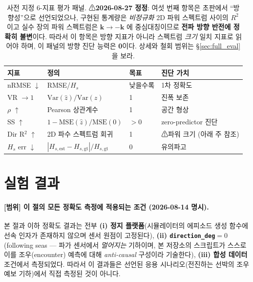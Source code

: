 \documentclass[11pt]{report}
\numberwithin{equation}{chapter}
\numberwithin{figure}{chapter}
\numberwithin{table}{chapter}
\begin{document}
\begin{table}[htbp]
\centering
\caption{사전 지정 6-지표 평가 패널.
⚠\textbf{2026-08-27 정정}: 여섯 번째 항목은 초판에서 ``방향성''으로 선언되었으나,
구현된 통계량은 \emph{비정규화} 2D 파워 스펙트럼 사이의 $R^2$ 이고
실수 장의 파워 스펙트럼은 $\mathbf{k}\to-\mathbf{k}$ 에 중심대칭이므로
\textbf{전파 방향 반전에 정확히 불변}이다. 따라서 이 항목은 방향 지표가 아니라
스펙트럼 \emph{크기} 일치 지표로 읽어야 하며, 이 패널의 방향 진단 능력은
\textbf{0}이다. 상세와 철회 범위는 \S\ref{sec:full_eval} 을 보라.}
\label{tab:metrics}
\begin{tabular}{llll}
\toprule
지표 & 정의 & 목표 & 진단 가치 \\
\midrule
nRMSE $\downarrow$ & RMSE/$H_s$ & 낮을수록 & 1차 정확도 \\
VR $\to 1$ & $\mathrm{Var}(\hat{z})/\mathrm{Var}(z)$ & 1 & 진폭 보존 \\
$\rho$ $\uparrow$ & Pearson 상관계수 & 1 & 공간 형상 \\
SS $\uparrow$ & $1 - \mathrm{MSE}(\hat{z})/\mathrm{MSE}(0)$ & $> 0$ & zero-predictor 진단 \\
Dir R$^2$ $\uparrow$ & 2D 파수 스펙트럼 회귀 & 1 & ⚠파워 크기 (아래 주 참조) \\
$H_s$ err $\downarrow$ & $|H_{s,\text{est}} - H_{s,\text{gt}}|/H_{s,\text{gt}}$ & 0 & 유의파고 \\
\bottomrule
\end{tabular}
\end{table}

\section{실험 결과}
\label{sec:results}

\paragraph{[범위] 이 절의 모든 정확도 측정에 적용되는 조건 (2026-08-14 명시).}
본 절과 이하 정확도 결과는 전부 \textbf{(i) 정지 플랫폼}(시뮬레이터의 에피소드 생성 함수에
선속 인자가 존재하지 않으며 센서 원점이 고정된다), \textbf{(ii) \texttt{direction\_deg}$=0$}
(following seas --- 파가 센서에서 \emph{멀어지는} 기하이며, 본 저장소의 스크립트가 스스로
이를 조우(encounter) 예측에 대해 \emph{anti-causal} 구성이라 기술한다),
\textbf{(iii) 합성 데이터} 조건에서 측정되었다.
따라서 이 결과들은 선언된 응용 시나리오(전진하는 선박의 조우 예보 기하)에서
직접 측정된 것이 아니다.
\end{document}
